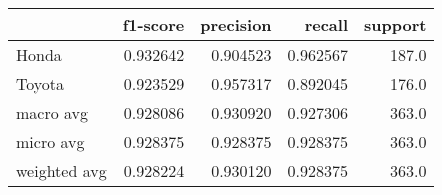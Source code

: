 \begin{tabular}{lrrrr}
\toprule
{} &  f1-score &  precision &    recall &  support \\
\midrule
Honda        &  0.932642 &   0.904523 &  0.962567 &    187.0 \\
Toyota       &  0.923529 &   0.957317 &  0.892045 &    176.0 \\
macro avg    &  0.928086 &   0.930920 &  0.927306 &    363.0 \\
micro avg    &  0.928375 &   0.928375 &  0.928375 &    363.0 \\
weighted avg &  0.928224 &   0.930120 &  0.928375 &    363.0 \\
\bottomrule
\end{tabular}
